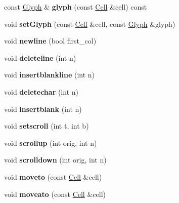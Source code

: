 \begin{DoxyCompactItemize}
const \mbox{\hyperlink{structGlyph}{Glyph}} \& {\bfseries glyph} (const \mbox{\hyperlink{structCell}{Cell}} \&cell) const
\item 
\mbox{\label{classScreen_a7a406d14a44085506e52a764f4c135d9}} 
void {\bfseries set\+Glyph} (const \mbox{\hyperlink{structCell}{Cell}} \&cell, const \mbox{\hyperlink{structGlyph}{Glyph}} \&glyph)
\item 
\mbox{\label{classScreen_ab74768c824dd17599531db35e54c85a8}} 
void {\bfseries newline} (bool first\+\_\+col)
\item 
\mbox{\label{classScreen_aeea0fdfd390ee72f2e0b4fa1406d994c}} 
void {\bfseries deleteline} (int n)
\item 
\mbox{\label{classScreen_a0ca423ee609231c844a62a35fab95bc7}} 
void {\bfseries insertblankline} (int n)
\item 
\mbox{\label{classScreen_a1098476d37e39959b8bf01ebddf12f28}} 
void {\bfseries deletechar} (int n)
\item 
\mbox{\label{classScreen_a056a2925885c36e983540119d96411a5}} 
void {\bfseries insertblank} (int n)
\item 
\mbox{\label{classScreen_a63977a1f6341b9e73aa042a27f03fb9a}} 
void {\bfseries setscroll} (int t, int b)
\item 
\mbox{\label{classScreen_a881072dc95b6b2d85ff4753f50b529ff}} 
void {\bfseries scrollup} (int orig, int n)
\item 
\mbox{\label{classScreen_a6d81b7b066247f114155cc7dba67c8fd}} 
void {\bfseries scrolldown} (int orig, int n)
\item 
\mbox{\label{classScreen_a33cc9446c7cb3f46a69e0a504aaa1620}} 
void {\bfseries moveto} (const \mbox{\hyperlink{structCell}{Cell}} \&cell)
\item 
\mbox{\label{classScreen_a797e7e646e2de5098033eadb5f989abc}} 
void {\bfseries moveato} (const \mbox{\hyperlink{structCell}{Cell}} \&cell)
\item 

\end{DoxyCompactItemize}
